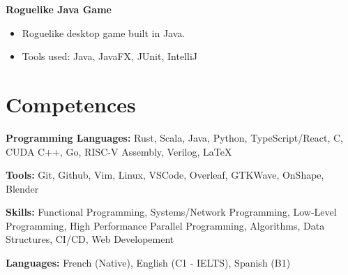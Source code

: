 \documentclass[a4paper, 10pt]{article}
\newenvironment{highlights}{
    \begin{itemize}[
        topsep=0.10 cm,
        parsep=0.10 cm,
        partopsep=0pt,
        itemsep=0pt,
        leftmargin=0.4 cm + 10pt
    ]
}{
    \end{itemize}
} %
\let\hrefWithoutArrow\href
\renewcommand{\href}[2]{\hrefWithoutArrow{#1}{\ifthenelse{\equal{#2}{}}{ }{#2 }\raisebox{.15ex}{\footnotesize \faExternalLink*}}}
\begin{document}
        \textbf{Roguelike Java Game}\href{https://github.com/maignal/Rogue-Like-Game-MP2-2022}{}
        \begin{highlights}
            \item Roguelike desktop game built in Java.
            \item Tools used: Java, JavaFX, JUnit, IntelliJ
        \end{highlights}






    \section{Competences}
    \textbf{Programming Languages:} Rust, Scala, Java, Python, TypeScript/React, C, CUDA C++, Go, RISC-V Assembly, Verilog, LaTeX

    \vspace{0.2 cm}

    \textbf{Tools:} Git, Github, Vim, Linux, VSCode, Overleaf, GTKWave, OnShape, Blender

    \vspace{0.2cm}

    \textbf{Skills:} Functional Programming, Systems/Network Programming, Low-Level Programming, High Performance Parallel Programming, Algorithms, Data Structures, CI/CD, Web Developement

    \vspace{0.2cm}

    \textbf{Languages:} French (Native), English (C1 - IELTS), Spanish (B1)


\end{document}
